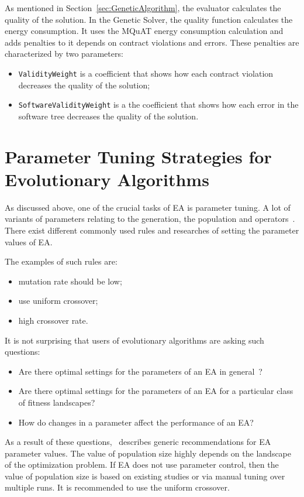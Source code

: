 As mentioned in Section~\ref{sec:GeneticAlgorithm}, the evaluator calculates the quality of the solution. In the Genetic Solver, the quality function calculates the energy consumption.
It uses the MQuAT energy consumption calculation and adds penalties to it depends on contract violations and errors. These penalties are characterized by two parameters:
\begin{itemize}
	\item \texttt{ValidityWeight} is a coefficient that shows how each contract violation decreases the quality of the solution;
	\item \texttt{SoftwareValidityWeight} is a the coefficient that shows how each error in the software tree decreases the quality of the solution.
\end{itemize}

\section{Parameter Tuning Strategies for Evolutionary Algorithms}\label{sec:Parameter Tuning Strategies}
As discussed above, one of the crucial tasks of EA is parameter tuning. A lot of variants of parameters relating to the generation, the population and operators~\cite{sipper2018investigating}. There exist different commonly used rules and researches of setting the parameter values of EA.

The examples of such rules are:
\begin{itemize}
	\item mutation rate should be low;
	\item use uniform crossover;
	\item high crossover rate.
\end{itemize}

It is not surprising that users of evolutionary algorithms are asking such questions:
\begin{itemize}
	\item Are there optimal settings for the parameters of an EA in general~\cite{de2007parameter}?
	\item Are there optimal settings for the parameters of an EA for a particular
	class of fitness landscapes?
	\item How do changes in a parameter affect the performance of an EA?
\end{itemize}

As a result of these questions,~\cite{de2007parameter} describes generic recommendations for EA parameter values.
The value of population size highly depends on the landscape of the optimization problem. If EA does not use parameter control, then the value of population size is based on existing studies or via manual tuning over multiple runs. It is recommended to use the uniform crossover. 

